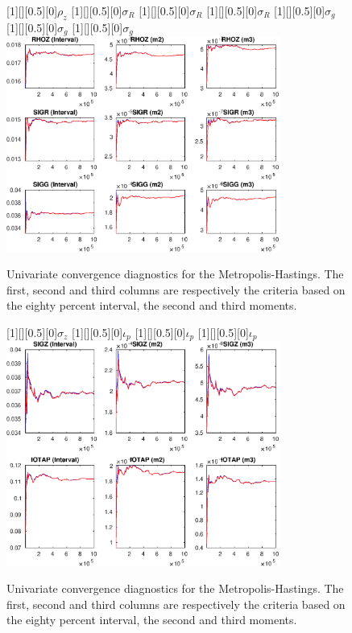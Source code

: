 \begin{figure}[H]
[1][][0.5][0]{$ {\rho_z} $}
[1][][0.5][0]{$ {\sigma_R} $}
[1][][0.5][0]{$ {\sigma_R} $}
[1][][0.5][0]{$ {\sigma_R} $}
[1][][0.5][0]{$ {\sigma_{g}} $}
[1][][0.5][0]{$ {\sigma_{g}} $}
[1][][0.5][0]{$ {\sigma_{g}} $}
\centering 
\includegraphics[width=0.80\textwidth]{AnSchoModTheBuilder/Output/AnSchoModTheBuilder_udiag4}
\caption{Univariate convergence diagnostics for the Metropolis-Hastings.
The first, second and third columns are respectively the criteria based on
the eighty percent interval, the second and third moments.}\label{Fig:UnivariateDiagnostics:4}
\end{figure}

\begin{figure}[H]
[1][][0.5][0]{$ {\sigma_z} $}
[1][][0.5][0]{$ {\iota_p} $}
[1][][0.5][0]{$ {\iota_p} $}
[1][][0.5][0]{$ {\iota_p} $}
\centering 
\includegraphics[width=0.80\textwidth]{AnSchoModTheBuilder/Output/AnSchoModTheBuilder_udiag5}
\caption{Univariate convergence diagnostics for the Metropolis-Hastings.
The first, second and third columns are respectively the criteria based on
the eighty percent interval, the second and third moments.}\label{Fig:UnivariateDiagnostics:5}
\end{figure}

